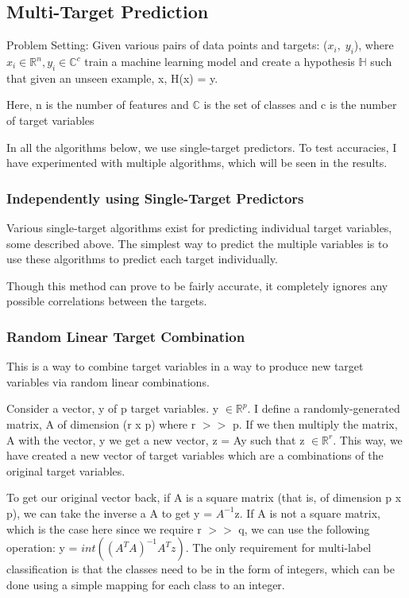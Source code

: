 \documentclass[letterpaper, 11 pt, conference]{IEEEtran}  %
\begin{document}
\subsection{\textbf{Multi-Target Prediction}}
Problem Setting: Given various pairs of data points and targets: ($x_i,\;y_i$), where $x_i \in \mathbb{R}^n, y_i \in \mathbb{C}^c$ train a machine learning model and create a hypothesis $\mathbb{H}$ such that given an unseen example, x, H(x) = y.

Here, n is the number of features and $\mathbb{C}$ is the set of classes and c is the number of target variables

In all the algorithms below, we use single-target predictors. To test accuracies, I have experimented with multiple algorithms, which will be seen in the results.
\subsubsection{\textbf{Independently using Single-Target Predictors}}
Various single-target algorithms exist for predicting individual target variables, some described above. The simplest way to predict the multiple variables is to use these algorithms to predict each target individually.

Though this method can prove to be fairly accurate, it completely ignores any possible correlations between the targets.

\subsubsection{\textbf{Random Linear Target Combination}}
This is a way to combine target variables in a way to produce new target variables via random linear combinations.

Consider a vector, y of p target variables. y $\in \mathbb{R}^p$. I define a randomly-generated matrix, A of dimension (r x p) where r $>>$ p. If we then multiply the matrix, A with the vector, y we get a new vector, z = Ay such that z $\in \mathbb{R}^r$. This way, we have created a new vector of target variables which are a combinations of the original target variables. 

To get our original vector back, if A is a square matrix (that is, of dimension p x p), we can take the inverse a A to get y = $A^{-1}$z. If A is not a square matrix, which is the case here since we require r $>>$ q, we can use the following operation: y = $int((A^TA)^{-1}A^Tz)$. The only requirement for multi-label classification is that the classes need to be in the form of integers, which can be done using a simple mapping for each class to an integer.
\end{document}
